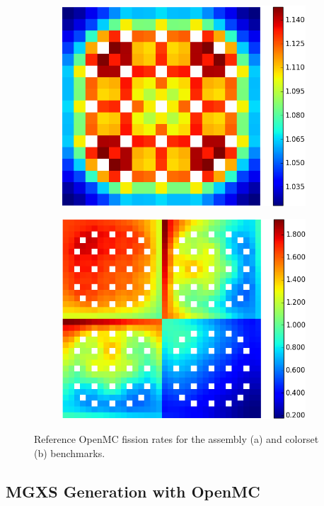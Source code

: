 \begin{figure}[h!]
\centering
\begin{subfigure}{0.45\textwidth}
  \centering
  \includegraphics[width=0.8\linewidth]{figures/assembly/fission-rates}
  \caption{}
  \label{fig:fiss-assm}
\end{subfigure}%
\begin{subfigure}{0.45\textwidth}
  \centering
  \includegraphics[width=0.8\linewidth]{figures/colorset/fission-rates}
  \caption{}
  \label{fig:capt-assm}
\end{subfigure}
\caption{Reference OpenMC fission rates for the assembly (a) and colorset (b) benchmarks.}
\label{fig:benchmarks-fiss-rates}
\end{figure}


\subsection{MGXS Generation with OpenMC}
\label{subsec:openmc}


